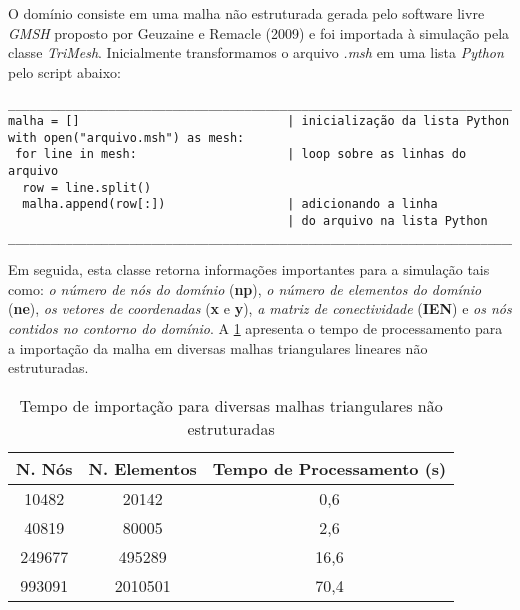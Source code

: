 O domínio consiste em uma malha não estruturada
gerada pelo software livre \textit{GMSH} proposto por Geuzaine e Remacle (2009) \cite{gmsh} e foi importada
à simulação pela classe \textit{TriMesh}.
Inicialmente transformamos o arquivo \textit{.msh}
em uma lista \textit{Python} pelo script abaixo:

\begin{verbatim}
__________________________________________________________________________
malha = []                             | inicialização da lista Python
with open("arquivo.msh") as mesh:       
 for line in mesh:                     | loop sobre as linhas do arquivo
  row = line.split()                   
  malha.append(row[:])                 | adicionando a linha
                                       | do arquivo na lista Python
__________________________________________________________________________
\end{verbatim}


Em seguida, esta classe retorna informações
importantes para a simulação tais como: 
\textit{o número de nós do domínio} (\textbf{np}),
\textit{o número de elementos do domínio} (\textbf{ne}),
\textit{os vetores de coordenadas} (\textbf{x} e \textbf{y}), 
\textit{a matriz de conectividade} (\textbf{IEN}) e 
\textit{os nós contidos no contorno do domínio}.
A \ref{tempo malha} apresenta o tempo de processamento para a 
importação da malha em diversas
malhas triangulares lineares não estruturadas.

\vspace{0.5cm}
\begin{table}[H]
\centering
\begin{tabular}{ccc}
\toprule
\textbf{N. Nós} & \textbf{N. Elementos} & \textbf{Tempo de Processamento} (s) \\
\midrule
10482 & 20142 & 0,6 \\
40819 & 80005 & 2,6 \\
249677 & 495289 & 16,6 \\
993091 & 2010501 & 70,4 \\
\bottomrule
\end{tabular}
\caption{Tempo de importação para diversas malhas triangulares não estruturadas}
\label{tempo malha}
\end{table}

\newpage

